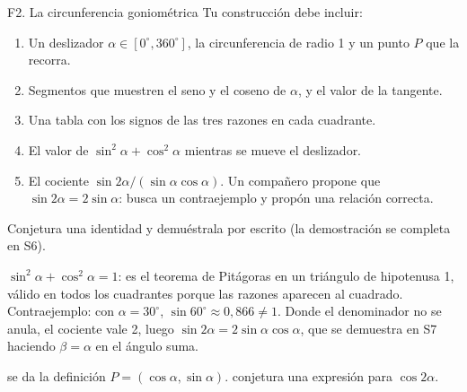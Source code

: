 \begin{tarjeta}{F2. La circunferencia goniométrica}
Tu construcción debe incluir:
\begin{enumerate}[leftmargin=1.5em]
  \item Un deslizador $\alpha\in[0^\circ,360^\circ]$, la circunferencia de radio 1 y un punto $P$ que la recorra.
  \item Segmentos que muestren el seno y el coseno de $\alpha$, y el valor de la tangente.
  \item Una tabla con los signos de las tres razones en cada cuadrante.
  \item El valor de $\sin^2\alpha+\cos^2\alpha$ mientras se mueve el deslizador.
  \item El cociente $\sin 2\alpha/(\sin\alpha\cos\alpha)$. Un compañero propone que $\sin 2\alpha=2\sin\alpha$: busca un contraejemplo y propón una relación correcta.
\end{enumerate}
 Conjetura una identidad y demuéstrala por escrito (la demostración se completa en S6).

 $\sin^2\alpha+\cos^2\alpha=1$: es el teorema de Pitágoras en un triángulo de hipotenusa 1, válido en todos los cuadrantes porque las razones aparecen al cuadrado. Contraejemplo: con $\alpha=30^\circ$, $\sin60^\circ\approx0{,}866\neq1$. Donde el denominador no se anula, el cociente vale 2, luego $\sin2\alpha=2\sin\alpha\cos\alpha$, que se demuestra en S7 haciendo $\beta=\alpha$ en el ángulo suma.

 se da la definición $P=(\cos\alpha,\sin\alpha)$.  conjetura una expresión para $\cos2\alpha$.
\end{tarjeta}

